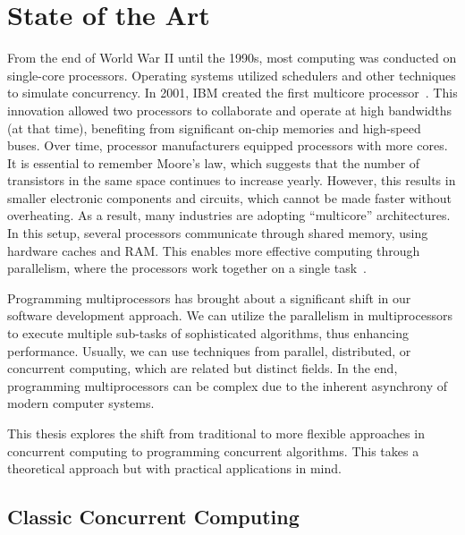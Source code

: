 \chapter{\label{chapter:2_State_of_art}State of the Art}

From the end of World War II until the 1990s, most computing was conducted on single-core processors. Operating systems utilized schedulers and other techniques to simulate concurrency. In 2001, IBM created the first multicore processor~\cite{ibmIBM100Power}. This innovation allowed two processors to collaborate and operate at high bandwidths (at that time), benefiting from significant on-chip memories and high-speed buses. Over time, processor manufacturers equipped processors with more cores. It is essential to remember Moore's law, which suggests that the number of transistors in the same space continues to increase yearly. However, this results in smaller electronic components and circuits, which cannot be made faster without overheating. As a result, many industries are adopting ``multicore'' architectures. In this setup, several processors communicate through shared memory, using hardware caches and RAM. This enables more effective computing through parallelism, where the processors work together on a single task~\cite{DBLP_books_daglib_0020056}.

Programming multiprocessors has brought about a significant shift in our software development approach. We can utilize the parallelism in multiprocessors to execute multiple sub-tasks of sophisticated algorithms, thus enhancing performance. Usually, we can use techniques from parallel, distributed, or concurrent computing, which are related but distinct fields. In the end, programming multiprocessors can be complex due to the inherent asynchrony of modern computer systems.

This thesis explores the shift from traditional to more flexible approaches in concurrent computing to programming concurrent algorithms. This takes a theoretical approach but with practical applications in mind.

\section{\label{section:classic-concurrent}Classic Concurrent Computing}

